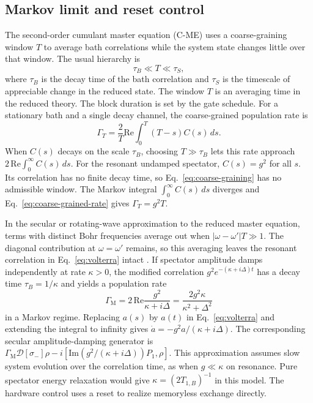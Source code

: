 \documentclass[
    pra,
    showpacs,
    groupedaddress,
    notitlepage,
    floatfix,
    nofootinbib
]{revtex4-2}
\newcommand{\Diss}{\mathcal{D}}
\begin{document}
\subsection{Markov limit and reset control}
The second-order cumulant master equation (C-ME) uses a coarse-graining window $T$ to average bath correlations while the system state changes
little over that window. The usual hierarchy is \cite{breuer,lidar}
\begin{equation}
 \tau_B\ll T\ll\tau_S,
 \label{eq:coarse-graining}
\end{equation}
where $\tau_B$ is the decay time of the bath correlation and $\tau_S$ is the timescale of appreciable change in the reduced state.
The window $T$ is an averaging time in the reduced theory. The block duration is set by the gate schedule. For a stationary bath
and a single decay channel, the coarse-grained population rate is
\begin{equation}
 \Gamma_T=\frac{2}{T}\mathrm{Re}\!\int_0^T (T-s)C(s)\,ds.
 \label{eq:coarse-grained-rate}
\end{equation}
When $C(s)$ decays on the scale $\tau_B$, choosing $T\gg\tau_B$ lets this rate approach $2\,\mathrm{Re}\int_0^\infty C(s)\,ds$.
For the resonant undamped spectator,
$C(s)=g^2$ for all $s$. Its correlation has no finite decay time, so Eq.~\eqref{eq:coarse-graining} has no admissible window. The Markov integral
$\int_0^\infty C(s)\,ds$ diverges and Eq.~\eqref{eq:coarse-grained-rate} gives $\Gamma_T=g^2T$.

In the secular or rotating-wave approximation to the reduced master equation, terms with distinct Bohr frequencies average out when
$|\omega-\omega'|T\gg1$. The diagonal contribution at $\omega=\omega'$ remains, so this averaging leaves the resonant correlation in
Eq.~\eqref{eq:volterra} intact \cite{breuer,lidar}. If spectator amplitude damps independently at rate $\kappa>0$, the modified correlation
$g^2e^{-(\kappa+i\Delta)t}$ has a decay time $\tau_B=1/\kappa$ and yields a population rate
\begin{equation}
 \Gamma_{\mathrm M}=2\,\mathrm{Re}\frac{g^2}{\kappa+i\Delta}
                   =\frac{2g^2\kappa}{\kappa^2+\Delta^2}
\end{equation}
in a Markov regime. Replacing $a(s)$ by $a(t)$ in Eq.~\eqref{eq:volterra} and extending the integral to infinity gives 
$\dot a=-g^2a/(\kappa+i\Delta)$. The corresponding secular amplitude-damping generator is 
$\Gamma_{\mathrm M}\Diss[\sigma_-]\rho-i[\mathrm{Im}(g^2/(\kappa+i\Delta))P_1,\rho]$. This approximation assumes slow system evolution 
over the correlation time, as when $g\ll\kappa$ on resonance. Pure spectator energy relaxation would give $\kappa=(2T_{1,B})^{-1}$ in this model. 
The hardware control uses a reset to realize memoryless exchange directly.
\end{document}

